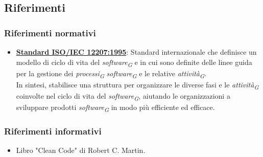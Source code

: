 \subsection{Riferimenti}
\subsubsection{Riferimenti normativi}
\begin{itemize}
    \item \href{https://www.math.unipd.it/~tullio/IS-1/2009/Approfondimenti/ISO_12207-1995.pdf}{\textbf{Standard ISO/IEC 12207:1995}}:
        Standard internazionale che definisce un modello di ciclo di vita del \textit{software}\textsubscript{\textit{G}} e in cui sono definite delle linee guida per la gestione dei \textit{processi}\textsubscript{\textit{G}} \textit{software}\textsubscript{\textit{G}} e le relative \textit{attività}\textsubscript{\textit{G}}. \\
        In sintesi, stabilisce una struttura per organizzare le diverse fasi e le \textit{attività}\textsubscript{\textit{G}} coinvolte nel ciclo di vita del \textit{software}\textsubscript{\textit{G}}, aiutando le organizzazioni a sviluppare prodotti \textit{software}\textsubscript{\textit{G}} in modo più efficiente ed efficace.

\end{itemize}
\subsubsection{Riferimenti informativi}
\begin{itemize}
    \item  Libro "Clean Code" di Robert C. Martin. 
\end{itemize}
